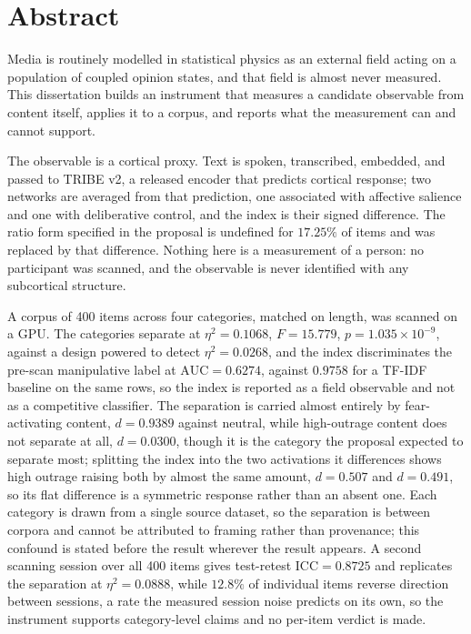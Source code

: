 \chapter*{Abstract}

Media is routinely modelled in statistical physics as an external field acting on a
population of coupled opinion states, and that field is almost never measured. This
dissertation builds an instrument that measures a candidate observable from content itself,
applies it to a corpus, and reports what the measurement can and cannot support.

The observable is a cortical proxy. Text is spoken, transcribed, embedded, and passed to
TRIBE v2, a released encoder that predicts cortical response; two networks are averaged from
that prediction, one associated with affective salience and one with deliberative control,
and the index is their signed difference. The ratio form specified in the proposal is
undefined for $17.25\%$ of items and was replaced by that difference. Nothing here is a
measurement of a person: no participant was scanned, and the observable is never identified
with any subcortical structure.

A corpus of 400 items across four categories, matched on length, was scanned on a GPU. The
categories separate at $\eta^2 = 0.1068$, $F = 15.779$, $p = 1.035\times10^{-9}$, against a
design powered to detect $\eta^2 = 0.0268$, and the index discriminates the pre-scan
manipulative label at $\mathrm{AUC} = 0.6274$, against $0.9758$ for a TF-IDF baseline on the
same rows, so the index is reported as a field observable and not as a competitive classifier.
The separation is carried almost entirely by fear-activating content, $d = 0.9389$ against
neutral, while high-outrage content does not separate at all, $d = 0.0300$, though it is the
category the proposal expected to separate most; splitting the index into the two activations
it differences shows high outrage raising both by almost the same amount, $d = 0.507$ and
$d = 0.491$, so its flat difference is a symmetric response rather than an absent one. Each category is drawn from a single source dataset, so the separation is between
corpora and cannot be attributed to framing rather than provenance; this confound is stated
before the result wherever the result appears. A second scanning session over all 400 items
gives test-retest $\mathrm{ICC} = 0.8725$ and replicates the separation at $\eta^2 = 0.0888$,
while $12.8\%$ of individual items reverse direction between sessions, a rate the measured
session noise predicts on its own, so the instrument supports category-level claims and no
per-item verdict is made.

